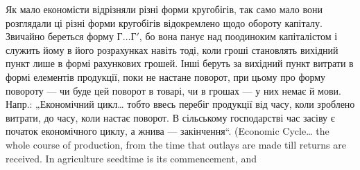 Як мало економісти відрізняли різні форми кругобігів, так само мало
вони розглядали ці різні форми кругобігів відокремлено щодо обороту
капіталу. Звичайно береться форму $Г\dots{} Г'$, бо вона панує над поодиноким
капіталістом і служить йому в його розрахунках навіть тоді, коли
гроші становлять вихідний пункт лише в формі рахункових грошей. Інші
беруть за вихідний пункт витрати в формі елементів продукції, поки
не настане поворот, при цьому про форму повороту — чи буде цей поворот
в товарі, чи в грошах — у них немає й мови. Напр.: „Економічний
цикл\dots{} тобто ввесь перебіг продукції від часу, коли зроблено витрати,
до часу, коли настає поворот. В сільському господарстві час засіву є
початок економічного циклу, а жнива — закінчення“. (Economic Cycle\dots{}
the whole course of production, from the time that outlays are made till
returns are received. In agriculture seedtime is its commencement, and
\parbreak{}  %
